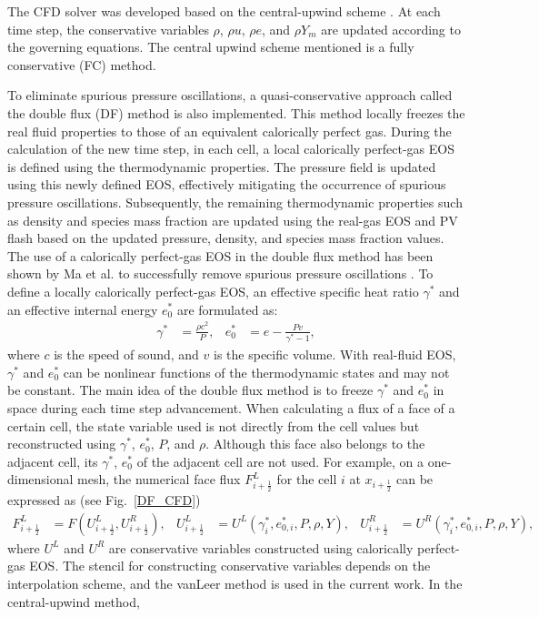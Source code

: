 The CFD solver was developed based on the central-upwind scheme \cite{kurganov2001semidiscrete,greenshields2010implementation}. At each time step, the conservative variables $\rho$, $\rho u$, $\rho e$, and $\rho Y_m$ are updated according to the governing equations. The central upwind scheme mentioned is a fully conservative (FC) method. 

To eliminate spurious pressure oscillations, a quasi-conservative approach called the double flux (DF) method \cite{abgrall2001computations,billet2003adaptive,ma2017entropy} is also implemented.
This method locally freezes the real fluid properties to those of an equivalent calorically perfect gas. During the calculation of the new time step, in each cell, a local calorically perfect-gas EOS is defined using the thermodynamic properties. The pressure field is updated using this newly defined EOS, effectively mitigating the occurrence of spurious pressure oscillations. Subsequently, the remaining thermodynamic properties such as density and species mass fraction are updated using the real-gas EOS and PV flash based on the updated pressure, density, and species mass fraction values. The use of a calorically perfect-gas EOS in the double flux method has been shown by Ma et al. to successfully remove spurious pressure oscillations \cite{ma2017entropy}. To define a locally calorically perfect-gas EOS, an effective specific heat ratio $\gamma^*$ and an effective internal energy $e_0^*$  are formulated as:
\begin{align}
\gamma^*& = \frac{\rho c^2}{P},&e_0^*&= e-\frac{Pv}{\gamma^*-1},
\end{align}
where $c$ is the speed of sound, and $v$ is the specific volume. %
With real-fluid EOS, $\gamma^*$ and $e_0^*$ can be nonlinear functions of the thermodynamic states and may not be constant. The main idea of the double flux method is to freeze $\gamma^*$ and $e_0^*$ in space during each time step advancement. When calculating a flux of a face of a certain cell, the state variable used is not directly from the cell values but reconstructed using $\gamma^*$, $e_0^*$, $P$, and $\rho$. Although this face also belongs to the adjacent cell, its $\gamma^*$, $e_0^*$ of the adjacent cell are not used.  For example, on a one-dimensional mesh, the numerical face flux $F^L_{i+\frac{1}{2}}$ for the cell $i$ at $x_{i+\frac{1}{2}}$ can be expressed as (see Fig.~\ref{DF_CFD})
\begin{align}
F^L_{i+\frac{1}{2}}& = F\left(U^L_{i+\frac{1}{2}},U^R_{i+\frac{1}{2}}\right),&
U^L_{i+\frac{1}{2}}& = U^L\left(\gamma^*_i,e_{0,i}^*,P,\rho ,Y\right) ,&
U^R_{i+\frac{1}{2}}& = U^R\left(\gamma^*_i,e_{0,i}^*,P,\rho ,Y\right),
\end{align}
where $U^L$ and $U^R$ are conservative variables constructed using calorically perfect-gas EOS. The stencil for constructing conservative variables depends on the interpolation scheme, and the vanLeer method \cite{van1974towards} is used in the current work. In the central-upwind method,

